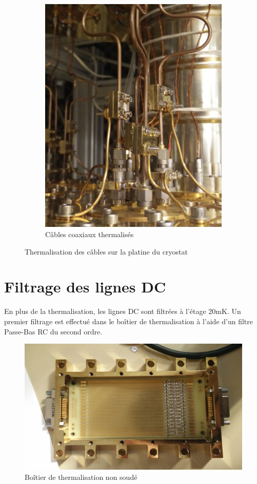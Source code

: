 \begin{figure}
\begin{subfigure}[t]{0.5\textwidth}
        \includegraphics[height=1.2\textwidth]{Images/Thermalisation/Coax}
        \caption{Câbles coaxiaux thermalisés}
    \end{subfigure}
    \caption{Thermalisation des câbles sur la platine du cryostat}
\end{figure}

\newpage
\section{Filtrage des lignes DC}
En plus de la thermalisation, les lignes DC sont filtrées à l'étage 20mK. Un premier filtrage est effectué dans le boîtier de thermalisation à l'aide d'un filtre Passe-Bas RC du second ordre.

\begin{figure}[h]
    \begin{center}
        \includegraphics[height=0.4\textwidth]{Images/Thermalisation/DC3}
        \caption{Boîtier de thermalisation non soudé}
        \label{coax_denudage}
    \end{center}
\end{figure}

